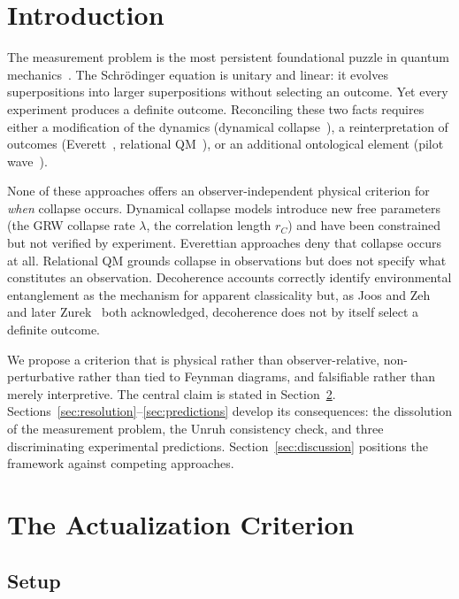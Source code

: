 \documentclass[11pt,twocolumn]{article}
\begin{document}
\section{Introduction}

The measurement problem is the most persistent foundational puzzle
in quantum mechanics~\cite{Bell1990}.
The Schr\"odinger equation is unitary and linear: it evolves
superpositions into larger superpositions without selecting an
outcome. Yet every experiment produces a definite outcome.
Reconciling these two facts requires either a modification of the
dynamics (dynamical collapse~\cite{GRW1986,Pearle1989}), a reinterpretation
of outcomes (Everett~\cite{Everett1957}, relational QM~\cite{Rovelli1996}),
or an additional ontological element (pilot wave~\cite{Bohm1952}).

None of these approaches offers an observer-independent physical
criterion for \emph{when} collapse occurs.
Dynamical collapse models introduce new free parameters
(the GRW collapse rate $\lambda$, the correlation length $r_C$)
and have been constrained but not verified by experiment.
Everettian approaches deny that collapse occurs at all.
Relational QM grounds collapse in observations but does not
specify what constitutes an observation.
Decoherence accounts correctly identify environmental entanglement
as the mechanism for apparent classicality but, as Joos and
Zeh~\cite{Joos1985} and later Zurek~\cite{Zurek2003} both acknowledged,
decoherence does not by itself select a definite outcome.

We propose a criterion that is physical rather than observer-relative,
non-perturbative rather than tied to Feynman diagrams, and
falsifiable rather than merely interpretive.
The central claim is stated in Section~\ref{sec:criterion}.
Sections~\ref{sec:resolution}--\ref{sec:predictions} develop
its consequences: the dissolution of the measurement problem,
the Unruh consistency check, and three discriminating experimental
predictions.
Section~\ref{sec:discussion} positions the framework against
competing approaches.

\section{The Actualization Criterion}
\label{sec:criterion}

\subsection{Setup}
\end{document}
